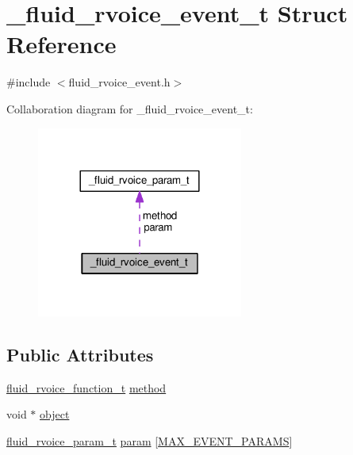 \hypertarget{struct__fluid__rvoice__event__t}{}\section{\+\_\+fluid\+\_\+rvoice\+\_\+event\+\_\+t Struct Reference}
\label{struct__fluid__rvoice__event__t}


{\ttfamily \#include $<$fluid\+\_\+rvoice\+\_\+event.\+h$>$}



Collaboration diagram for \+\_\+fluid\+\_\+rvoice\+\_\+event\+\_\+t\+:
\nopagebreak
\begin{figure}[H]
\begin{center}
\leavevmode
\includegraphics[width=192pt]{struct__fluid__rvoice__event__t__coll__graph}
\end{center}
\end{figure}
\subsection*{Public Attributes}
\begin{DoxyCompactItemize}
\item 
\hyperlink{fluidsynth__priv_8h_a0060fc40a6e757de7831c327a50f367f}{fluid\+\_\+rvoice\+\_\+function\+\_\+t} \hyperlink{struct__fluid__rvoice__event__t_a6996b53072eb21fa652ae8a9e21af8b7}{method}
\item 
void $\ast$ \hyperlink{struct__fluid__rvoice__event__t_acb0e1885f335058c24135b2363bfec3a}{object}
\item 
\hyperlink{fluidsynth__priv_8h_a4a8827d32fba2a1b5404844259d3d4d0}{fluid\+\_\+rvoice\+\_\+param\+\_\+t} \hyperlink{struct__fluid__rvoice__event__t_a7a9db4f028eb563d83802e8f474c563a}{param} \mbox{[}\hyperlink{fluidsynth__priv_8h_a726ca809ffd3d67ab4b8476646f26635a51ab886d33970c14e4b358ade8efee22}{M\+A\+X\+\_\+\+E\+V\+E\+N\+T\+\_\+\+P\+A\+R\+A\+MS}\mbox{]}
\end{DoxyCompactItemize}


